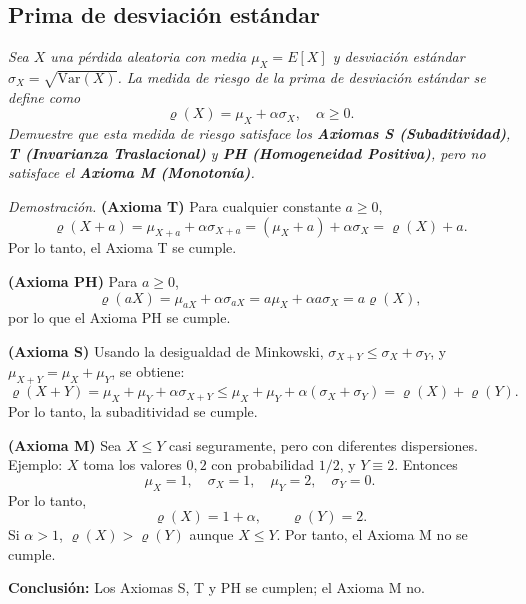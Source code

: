 \vspace{0.8cm}

\subsection{Prima de desviación estándar} \textit{Sea $X$ una pérdida aleatoria con media $\mu_X = E[X]$ y desviación estándar $\sigma_X = \sqrt{\text{Var}(X)}$. La medida de riesgo de la prima de desviación estándar se define como}
\[
\varrho(X) = \mu_X + \alpha\sigma_X, \quad \alpha \geq 0.
\]
\textit{Demuestre que esta medida de riesgo satisface los \textbf{Axiomas S (Subaditividad)}, \textbf{T (Invarianza Traslacional)} y \textbf{PH (Homogeneidad Positiva)}, pero no satisface el \textbf{Axioma M (Monotonía)}.}

\vspace{0.3cm}
\noindent \textit{Demostración.} \textbf{(Axioma T)} Para cualquier constante $a \geq 0$,
\[
\varrho(X + a) = \mu_{X+a} + \alpha\sigma_{X+a} = (\mu_X + a) + \alpha\sigma_X = \varrho(X) + a.
\]
Por lo tanto, el Axioma T se cumple.

\vspace{0.2cm}
\noindent \textbf{(Axioma PH)} Para $a \geq 0$,
\[
\varrho(aX) = \mu_{aX} + \alpha\sigma_{aX} = a\mu_X + \alpha a\sigma_X = a\varrho(X),
\]
por lo que el Axioma PH se cumple.

\vspace{0.2cm}
\noindent \textbf{(Axioma S)} Usando la desigualdad de Minkowski, $\sigma_{X+Y} \leq \sigma_X + \sigma_Y$, y $\mu_{X+Y} = \mu_X + \mu_Y$, se obtiene:
\[
\varrho(X + Y) = \mu_X + \mu_Y + \alpha\sigma_{X+Y} \leq \mu_X + \mu_Y + \alpha(\sigma_X + \sigma_Y) = \varrho(X) + \varrho(Y).
\]
Por lo tanto, la subaditividad se cumple.

\vspace{0.2cm}
\noindent \textbf{(Axioma M)} Sea $X \leq Y$ casi seguramente, pero con diferentes dispersiones. Ejemplo: $X$ toma los valores $0, 2$ con probabilidad $1/2$, y $Y \equiv 2$. Entonces
\[
\mu_X = 1, \quad \sigma_X = 1, \quad \mu_Y = 2, \quad \sigma_Y = 0.
\]
Por lo tanto,
\[
\varrho(X) = 1 + \alpha, \qquad \varrho(Y) = 2.
\]
Si $\alpha > 1$, $\varrho(X) > \varrho(Y)$ aunque $X \leq Y$. Por tanto, el Axioma M no se cumple.

\vspace{0.2cm}
\textbf{Conclusión:} Los Axiomas S, T y PH se cumplen; el Axioma M no.

\vspace{0.8cm}

